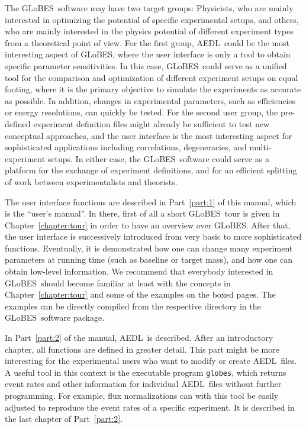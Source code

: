 \documentclass[a4paper,12pt,twoside]{book}
\newcommand{\Chapt}{Chapter}
\newcommand{\Part}{Part}
\newcommand{\GLOBES}{{\sf GLoBES}}
\newcommand{\AEDL}{{\sf AEDL}}
\begin{document}
The \GLOBES\ software may have two target groups: 
Physicists, who are mainly interested in optimizing the potential
of specific experimental setups, and others, who are mainly
interested in the physics potential of different experiment types
from a theoretical point of view.
For the first group, \AEDL\ could be the most interesting aspect of
\GLOBES , where the user interface is only a tool to obtain specific
parameter sensitivities. In this case, \GLOBES\ could serve as a
unified tool for the comparison and optimization of different experiment
 setups on equal footing, where
it is the primary objective to simulate the experiments as accurate
as possible. In addition, changes in experimental parameters, such as
efficiencies or energy resolutions, can quickly be tested.
%
For the second user group, the pre-defined 
experiment definition files might already be sufficient to test
new conceptual approaches, and the user interface is the most interesting
aspect for sophisticated applications including correlations,
degeneracies, and multi-experiment setups. In either case, the \GLOBES\
software could serve as a platform for the exchange of experiment
definitions, and for an efficient splitting of work between
experimentalists and theorists.

The user interface functions are described in \Part~\ref{part:1} of 
this manual, which is the ``user's manual''. In there, first of all a 
short \GLOBES\ tour is given in \Chapt~\ref{chapter:tour} in order to 
have an overview over \GLOBES .
After that, the user
interface is successively introduced from very basic to more sophisticated
functions. Eventually, it is demonstrated how one can change many
experiment parameters at running time (such as baseline or target mass), and how one can obtain low-level
information. We recommend that everybody interested in \GLOBES\ should
become familiar at least with the concepts in \Chapt~\ref{chapter:tour}
 and some of the examples on the boxed pages. The examples can be 
 directly compiled 
 from the respective directory in the \GLOBES\ software package.

In \Part~\ref{part:2} of the manual, \AEDL\ is described. After an
introductory chapter, all functions are defined in greater detail.
This part might be more interesting for the experimental users who
want to modify or create \AEDL\ files. A useful tool in this context
is the executable program \verb+globes+, which returns event rates and other
information for individual \AEDL\ files without further programming. 
For example, flux normalizations can with this tool be easily adjusted 
to reproduce the event rates of a specific experiment. It is described
in the last chapter of \Part~\ref{part:2}.
\end{document}

